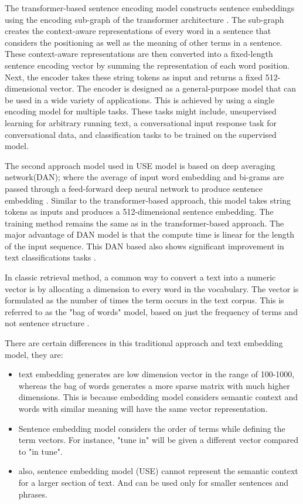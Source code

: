 The transformer-based sentence encoding model constructs sentence embeddings using the encoding sub-graph of the transformer architecture \cite{vaswani2017attention}. The sub-graph creates the context-aware representations of every word in a sentence that considers the positioning as well as the meaning of other terms in a sentence. These context-aware representations are then converted into a fixed-length sentence encoding vector by summing the representation of each word position. Next, the encoder takes these string tokens as input and returns a fixed 512-dimensional vector. The encoder is designed as a general-purpose model that can be used in a wide variety of applications. This is achieved by using a single encoding model for multiple tasks. These tasks might include, unsupervised learning for arbitrary running text, a conversational input response task for conversational data, and classification tasks to be trained on the supervised model. 

The second approach model used in USE model is based on deep averaging network(DAN); where the average of input word embedding and bi-grams are passed through a feed-forward deep neural network to produce sentence embedding \cite{iyyer2015deep}. 
Similar to the transformer-based approach, this model takes string tokens as inputs and produces a 512-dimensional sentence embedding.
The training method remains the same as in the transformer-based approach. The major advantage of DAN model is that the compute time is linear for the length of the input sequence. This DAN based also shows significant improvement in text classifications tasks \cite{RN32}.

In classic retrieval method, a common way to convert a text into a numeric vector is by allocating a dimension to every word in the vocabulary. The vector is formulated as the number of times the term occurs in the text corpus. This is referred to as the "bag of words" model, based on just the frequency of terms and not sentence structure \cite{julie2019USE}.

There are certain differences in this traditional approach and text embedding model, they are:
\begin{itemize}
    \item text embedding generates are low dimension vector in the range of 100-1000, whereas the bag of words generates a more sparse matrix with much higher dimensions. This is because embedding model considers semantic context and words with similar meaning will have the same vector representation.
    \item Sentence embedding model considers the order of terms while defining the term vectors. For instance, "tune in" will be given a different vector compared to "in tune". \cite{julie2019USE}
    \item also, sentence embedding model (USE) cannot represent the semantic context for a larger section of text. And can be used only for smaller sentences and phrases.
\end{itemize}

